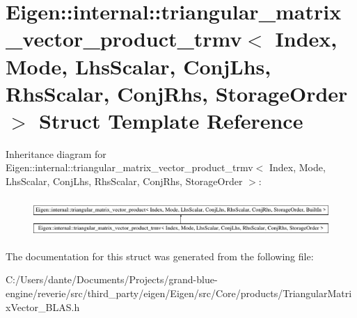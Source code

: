 \hypertarget{struct_eigen_1_1internal_1_1triangular__matrix__vector__product__trmv}{}\section{Eigen\+::internal\+::triangular\+\_\+matrix\+\_\+vector\+\_\+product\+\_\+trmv$<$ Index, Mode, Lhs\+Scalar, Conj\+Lhs, Rhs\+Scalar, Conj\+Rhs, Storage\+Order $>$ Struct Template Reference}
\label{struct_eigen_1_1internal_1_1triangular__matrix__vector__product__trmv}
Inheritance diagram for Eigen\+::internal\+::triangular\+\_\+matrix\+\_\+vector\+\_\+product\+\_\+trmv$<$ Index, Mode, Lhs\+Scalar, Conj\+Lhs, Rhs\+Scalar, Conj\+Rhs, Storage\+Order $>$\+:\begin{figure}[H]
\begin{center}
\leavevmode
\includegraphics[height=1.469816cm]{struct_eigen_1_1internal_1_1triangular__matrix__vector__product__trmv}
\end{center}
\end{figure}


The documentation for this struct was generated from the following file\+:\begin{DoxyCompactItemize}
\item 
C\+:/\+Users/dante/\+Documents/\+Projects/grand-\/blue-\/engine/reverie/src/third\+\_\+party/eigen/\+Eigen/src/\+Core/products/Triangular\+Matrix\+Vector\+\_\+\+B\+L\+A\+S.\+h\end{DoxyCompactItemize}
